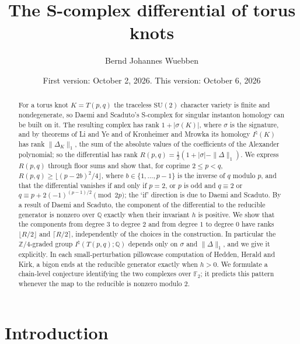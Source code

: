 \documentclass[11pt,reqno]{amsart}
\theoremstyle{plain}
\theoremstyle{definition}
\newcommand{\Z}{\mathbb{Z}}
\newcommand{\Q}{\mathbb{Q}}
\newcommand{\SU}{\mathrm{SU}(2)}
\newcommand{\Inat}{I^{\natural}}
\begin{document}
\title{The S-complex differential of torus knots}

\author{Bernd Johannes Wuebben}
\date{First version: October 2, 2026. This version: October 6, 2026}

\begin{abstract}
For a torus knot $K=T(p,q)$ the traceless $\SU$ character variety is finite and nondegenerate, so
Daemi and Scaduto's S-complex for singular instanton homology can be built on it. The resulting complex
has rank $1+|\sigma(K)|$, where $\sigma$ is the signature, and by theorems of Li and Ye and of Kronheimer
and Mrowka its homology $\Inat(K)$ has rank $\|\Delta_K\|_1$, the sum of the absolute values of the
coefficients of the Alexander polynomial; so the differential has rank $R(p,q)=\frac12(1+|\sigma|-\|\Delta\|_1)$.
We express $R(p,q)$ through floor sums and show that, for coprime $2\le p<q$, $R(p,q)\ge\lfloor(p-2b)^2/4\rfloor$,
where $b\in\{1,\dots,p-1\}$ is the inverse of $q$ modulo $p$, and that the differential vanishes if and
only if $p=2$, or $p$ is odd and $q\equiv2$ or $q\equiv p+2(-1)^{(p-1)/2}\pmod{2p}$; the `if' direction is
due to Daemi and Scaduto. By a result of Daemi and Scaduto, the component of the differential to the
reducible generator is nonzero over $\Q$ exactly when their invariant $h$ is positive. We show that the
components from degree $3$ to degree $2$ and from degree $1$ to degree $0$ have ranks $\lfloor R/2\rfloor$
and $\lceil R/2\rceil$, independently of the choices in the construction. In particular the
$\Z/4$-graded group $\Inat(T(p,q);\Q)$ depends only on $\sigma$ and $\|\Delta\|_1$, and we give it explicitly.
In each small-perturbation pillowcase computation of Hedden, Herald and Kirk, a bigon ends at the
reducible generator exactly when $h>0$. We formulate a chain-level conjecture identifying the two
complexes over $\mathbb F_2$; it predicts this pattern whenever the map to the reducible is nonzero
modulo $2$.
\end{abstract}

\maketitle

\section{Introduction}
\end{document}
